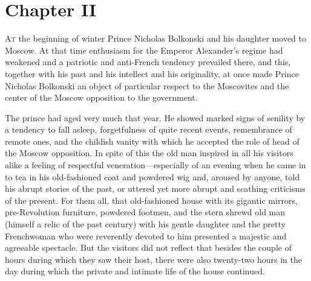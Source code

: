 \chapter*{Chapter II}
\ifaudio     
{} 
\fi

\lettrine[lines=2, loversize=0.3, lraise=0]{\initfamily A}{t}
the beginning of winter Prince Nicholas Bolkonski and his
daughter moved to Moscow. At that time enthusiasm for the Emperor
Alexander's regime had weakened and a patriotic and anti-French
tendency prevailed there, and this, together with his past and
his intellect and his originality, at once made Prince Nicholas
Bolkonski an object of particular respect to the Moscovites and
the center of the Moscow opposition to the government.

The prince had aged very much that year. He showed marked signs
of senility by a tendency to fall asleep, forgetfulness of quite
recent events, remembrance of remote ones, and the childish
vanity with which he accepted the role of head of the Moscow
opposition. In spite of this the old man inspired in all his
visitors alike a feeling of respectful veneration---especially of
an evening when he came in to tea in his old-fashioned coat and
powdered wig and, aroused by anyone, told his abrupt stories of
the past, or uttered yet more abrupt and scathing criticisms of
the present. For them all, that old-fashioned house with its
gigantic mirrors, pre-Revolution furniture, powdered footmen, and
the stern shrewd old man (himself a relic of the past century)
with his gentle daughter and the pretty Frenchwoman who were
reverently devoted to him presented a majestic and agreeable
spectacle. But the visitors did not reflect that besides the
couple of hours during which they saw their host, there were also
twenty-two hours in the day during which the private and intimate
life of the house continued.


